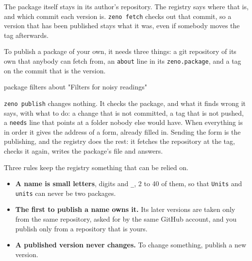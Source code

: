 The package itself stays in its author's repository. The registry
says where that is, and which commit each version is. \verb|zeno fetch|
checks out that commit, so a version that has been published stays
what it was, even if somebody moves the tag afterwards.

To publish a package of your own, it needs three things: a git
repository of its own that anybody can fetch from, an \verb|about|
line in its \verb|zeno.package|, and a tag on the commit that is the
version.

\begin{zenofrag}[lang=shell]
package filters
about "Filters for noisy readings"
\end{zenofrag}


\verb|zeno publish| changes nothing. It checks the package, and what
it finds wrong it says, with what to do: a change that is not
committed, a tag that is not pushed, a \verb|needs| line that points
at a folder nobody else would have. When everything is in order it
gives the address of a form, already filled in. Sending the form is
the publishing, and the registry does the rest: it fetches the
repository at the tag, checks it again, writes the package's file and
answers.

Three rules keep the registry something that can be relied on.

\begin{itemize}
\item \textbf{A name is small letters}, digits and \verb|_|, 2 to 40 of
  them, so that \verb|Units| and \verb|units| can never be two
  packages.
\item \textbf{The first to publish a name owns it.} Its later versions
  are taken only from the same repository, asked for by the same
  GitHub account, and you publish only from a repository that is
  yours.
\item \textbf{A published version never changes.} To change something,
  publish a new version.
\end{itemize}


